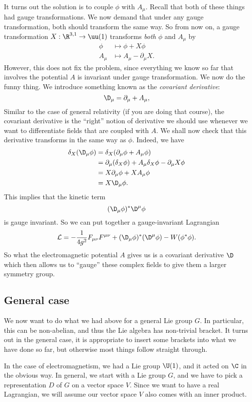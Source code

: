 \documentclass[a4paper]{article}
\begin{document}
It turns out the solution is to couple $\phi$ with $A_\mu$. Recall that both of these things had gauge transformations. We now demand that under any gauge transformation, both should transform the same way. So from now on, a gauge transformation $X: \R^{3, 1} \to \uu(1)$ transforms \emph{both} $\phi$ and $A_\mu$ by
\begin{align*}
  \phi &\mapsto \phi + X \phi\\
  A_\mu &\mapsto A_\mu - \partial_\mu X.
\end{align*}
However, this does not fix the problem, since everything we know so far that involves the potential $A$ is invariant under gauge transformation. We now do the funny thing. We introduce something known as the \emph{covariant derivative}:
\[
  \D_\mu = \partial_\mu + A_\mu,
\]
Similar to the case of general relativity (if you are doing that course), the covariant derivative is the ``right'' notion of derivative we should use whenever we want to differentiate fields that are coupled with $A$. We shall now check that this derivative transforms in the same way as $\phi$. Indeed, we have
\begin{align*}
  \delta_X(\D_\mu \phi) &= \delta_X(\partial_\mu \phi + A_\mu \phi)\\
  &= \partial_\mu (\delta_X \phi) + A_\mu \delta_X \phi - \partial_\mu X \phi\\
  &= X \partial_\mu \phi + X A_\mu \phi\\
  &= X \D_\mu \phi.
\end{align*}
This implies that the kinetic term
\[
  (\D_\mu \phi)^* \D^\mu \phi
\]
is gauge invariant. So we can put together a gauge-invariant Lagrangian
\[
  \mathcal{L} = -\frac{1}{4 g^2} F_{\mu\nu} F^{\mu\nu} + (\D_\mu \phi)^* (\D^\mu \phi) - W(\phi^* \phi).
\]
So what the electromagnetic potential $A$ gives us is a covariant derivative $\D$ which then allows us to ``gauge'' these complex fields to give them a larger symmetry group.

\subsection{General case}
We now want to do what we had above for a general Lie group $G$. In particular, this can be non-abelian, and thus the Lie algebra has non-trivial bracket. It turns out in the general case, it is appropriate to insert some brackets into what we have done so far, but otherwise most things follow straight through.

In the case of electromagnetism, we had a Lie group $\U(1)$, and it acted on $\C$ in the obvious way. In general, we start with a Lie group $G$, and we have to pick a representation $D$ of $G$ on a vector space $V$. Since we want to have a real Lagrangian, we will assume our vector space $V$ also comes with an inner product.
\end{document}
